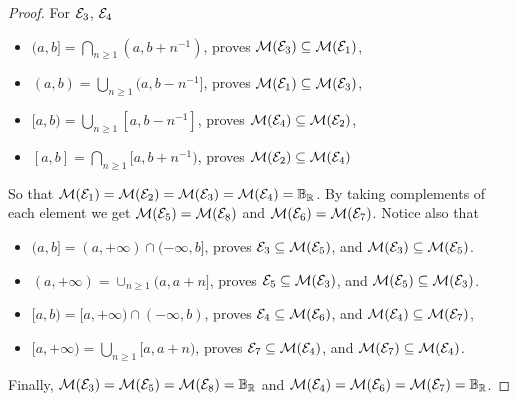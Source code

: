 \documentclass[../../main.tex]{subfiles}
\begin{document}
\begin{proof}
    For $\cal{E}_3$, $\cal{E}_4$ 
    \begin{itemize}
        \item $(a,b] = \bigcap_{n\geq 1}(a, b+n^{-1})$, proves $\gen{3}\subseteq\gen{1}$,
        \item $(a,b) = \bigcup_{n\geq 1}(a, b-n^{-1}]$, proves $\gen{1}\subseteq\gen{3}$,
        \item $[a,b) = \bigcup_{n\geq 1}[a, b-n^{-1}]$, proves $\gen{4}\subseteq\gen{2}$,
        \item $[a,b] = \bigcap_{n\geq 1}[a, b+n^{-1})$, proves $\gen{2}\subseteq\gen{4}$
    \end{itemize}
    So that $\gen{1}=\gen{2}=\gen{3}=\gen{4}=\borel$. By taking complements of each element we get $\gen{5}=\gen{8}$ and $\gen{6}=\gen{7}$. Notice also that
    \begin{itemize}
        \item $(a,b] = (a,+\infty)\cap (-\infty,b]$, proves $\cal{E}_3\subseteq\gen{5}$, and $\gen{3}\subseteq\gen{5}$.
        \item $(a,+\infty) = \cup_{n\geq 1}(a,a+n]$, proves $\cal{E}_5\subseteq\gen{3}$, and $\gen{5}\subseteq\gen{3}$.
        \item $[a,b) = [a,+\infty)\cap (-\infty, b)$, proves $\cal{E}_4\subseteq\gen{6}$, and $\gen{4}\subseteq\gen{7}$,
        \item $[a,+\infty) = \bigcup_{n\geq 1}[a,a+n)$, proves $\cal{E}_7\subseteq\gen{4}$, and $\gen{7}\subseteq\gen{4}$.
    \end{itemize}
    Finally, $\gen{3}=\gen{5}=\gen{8}=\borel$ and $\gen{4}=\gen{6}=\gen{7}=\borel$.
\end{proof}
\end{document}
